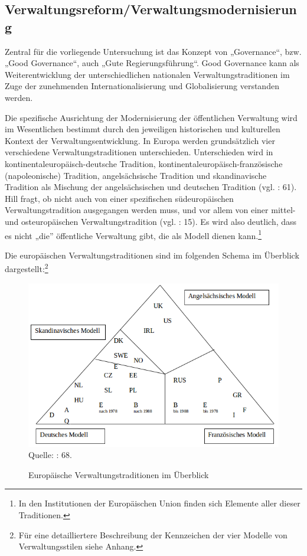 \subsection{Verwaltungsreform/Verwaltungsmodernisierung }
Zentral für die vorliegende Untersuchung ist das Konzept von „Governance“, bzw. „Good Governance“, auch „Gute Regierungsführung“. Good Governance kann als Weiterentwicklung der unterschiedlichen nationalen Verwaltungstraditionen im Zuge der zunehmenden Internationalisierung und Globalisierung verstanden werden.
\par
Die spezifische Ausrichtung der Modernisierung der öffentlichen Verwaltung wird im Wesentlichen bestimmt durch den jeweiligen historischen und kulturellen Kontext der Verwaltungsentwicklung. In Europa werden grundsätzlich vier verschiedene Verwaltungstraditionen unterschieden. Unterschieden wird in kontinentaleuropäisch-deutsche Tradition, kontinentaleuropäisch-französische (napoleonische) Tradition, angelsächsische Tradition und skandinavische Tradition als Mischung der angelsächsischen und deutschen Tradition (vgl. \cite{lipumb05} : 61). Hill fragt, ob nicht auch von einer spezifischen südeuropäischen Verwaltungstradition ausgegangen werden muss, und vor allem von einer mittel- und osteuropäischen Verwaltungstradition (vgl. \cite{hill06} : 15). Es wird also deutlich, dass es nicht „die” öffentliche Verwaltung gibt, die als Modell dienen kann.\footnote{In den Institutionen der Europäischen Union finden sich Elemente aller dieser Traditionen.}
\par
Die europäischen Verwaltungstraditionen sind im folgenden Schema im Überblick dargestellt:\footnote{Für eine detailliertere Beschreibung der Kennzeichen der vier Modelle von Verwaltungsstilen siehe Anhang.}
\begin{figure}[H]
  \caption{Europäische Verwaltungstraditionen im Überblick}
  \centering
  \includegraphics[width=5in]{Material/VerwaltungsModelle}\\
Quelle: \cite{lipumb05} : 68.
\end{figure}

